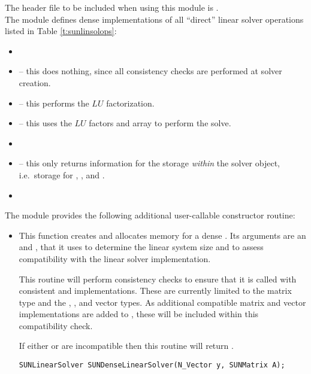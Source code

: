\noindent The header file to be included when using this module 
is . \\
The {\sunlinsoldense} module defines dense implementations of all
``direct'' linear solver operations listed in
Table \ref{t:sunlinsolops}:
\begin{itemize}
\item {}
\item {} -- this does nothing, since all
  consistency checks are performed at solver creation.
\item {} -- this performs the $LU$ factorization.
\item {} -- this uses the $LU$ factors
  and  array to perform the solve.
\item {}
\item {} -- this only returns information for
  the storage \emph{within} the solver object, i.e.~storage
  for , , and .
\item {}
\end{itemize}
The module {\sunlinsoldense} provides the following additional
user-callable constructor routine: 
\begin{itemize}


\item {}

  This function creates and allocates memory for a dense .
  Its arguments are an {\nvector} and {\sunmatrix}, that it uses to
  determine the linear system size and to assess compatibility with
  the linear solver implementation.

  This routine will perform consistency checks to ensure that it is
  called with consistent {\nvector} and {\sunmatrix} implementations.
  These are currently limited to the {\sunmatdense} matrix type and
  the {\nvecs}, {\nvecopenmp}, and {\nvecpthreads} vector types.  As
  additional compatible matrix and vector implementations are added to
  {\sundials}, these will be included within this compatibility check.

  If either  or  are incompatible then this routine will
  return .

  \verb|SUNLinearSolver SUNDenseLinearSolver(N_Vector y, SUNMatrix A);|

\end{itemize}
